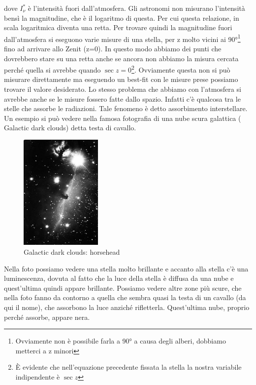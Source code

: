 \documentclass[a4paper,11pt]{article}
\begin{document}
    dove $I_{\nu}^*$ è l'intensità fuori dall'atmosfera. Gli astronomi non misurano l'intensità bensì la magnitudine, che è il logaritmo di questa. Per cui questa relazione, in scala logaritmica diventa una retta. Per trovare quindi la magnitudine fuori dall'atmosfera  si eseguono varie misure di una stella, per z molto vicini ai 90°\footnote{ Ovviamente non è possibile farla a 90° a causa degli alberi, dobbiamo metterci a z minori} fino ad arrivare allo Zenit (z=0). In questo modo abbiamo dei punti che dovrebbero stare su una retta anche se ancora non abbiamo la misura cercata perché quella si avrebbe quando $ \sec{z} = 0$\footnote{È evidente che nell'equazione precedente fissata la stella la nostra variabile indipendente è $\sec{z}$}. Ovviamente questa non si può misurare direttamente ma eseguendo un best-fit con le misure prese possiamo trovare il valore desiderato. 
    Lo stesso problema che abbiamo con l'atmosfera si avrebbe anche se le misure fossero fatte dallo spazio. Infatti c'è qualcosa tra le stelle che assorbe le radiazioni. Tale fenomeno è detto assorbimento interstellare. Un esempio si può vedere nella famosa fotografia di una nube scura galattica ( Galactic dark clouds) detta testa di cavallo.
    
    \begin{figure}[h!!]
        \centering
        \includegraphics[width=4cm]{horsehead.jpg}
        \caption{Galactic dark clouds: horsehead}
        \label{fig:horsehead}
    \end{figure}
    
    Nella foto possiamo vedere una stella molto brillante e accanto alla stella c'è una luminescenza, dovuta al fatto che la luce della stella è diffusa da una nube e quest'ultima quindi appare brillante. Possiamo vedere altre zone più scure, che nella foto fanno da contorno a quella che sembra quasi la testa di un cavallo (da qui il nome), che assorbono la luce anziché rifletterla. Quest'ultima nube, proprio perché assorbe, appare nera.
    
\end{document}
